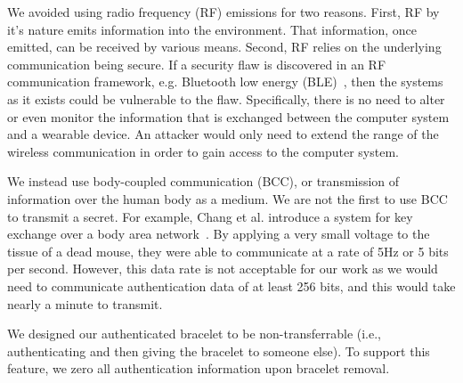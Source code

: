 \documentclass[runningheads,a4paper]{llncs}
\begin{document}
We avoided using radio frequency (RF) emissions for two reasons.  First, RF by it's nature emits information into the environment.  That information, once emitted, can be received by various means.  Second, RF relies on the underlying communication being secure.  If a security flaw is discovered in an RF communication framework, e.g. Bluetooth low energy (BLE)~\cite{BLEATTACK}, then the systems as it exists could be vulnerable to the flaw.  Specifically, there is no need to alter or even monitor the information that is exchanged between the computer system and a wearable device.  An attacker would only need to extend the range of the wireless communication in order to gain access to the computer system.


We instead use body-coupled communication (BCC), or transmission of information over the human body as a medium. We are not the first to use BCC to transmit a secret. For example, Chang et al. introduce a system for key exchange over a body area network~\cite{chang:healthtech:2013}. By applying a very small voltage to the tissue of a dead mouse, they were able to communicate at a rate of 5Hz or 5 bits per second.  However, this data rate is not acceptable for our work as we would need to communicate authentication data of at least 256 bits, and this would take nearly a minute to transmit.  


We designed our authenticated bracelet to be non-transferrable (i.e., authenticating and then giving the bracelet to someone else). To support this feature, we zero all authentication information upon bracelet removal. 

\end{document}
